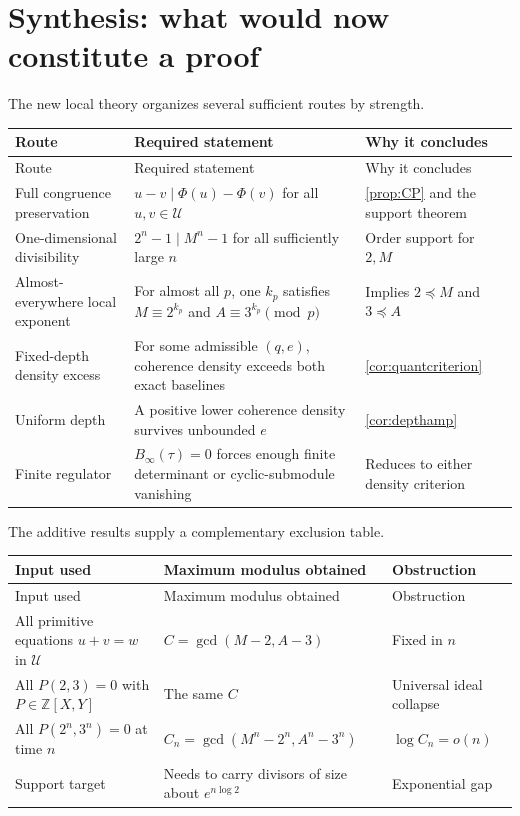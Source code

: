 \documentclass[11pt]{article}
\theoremstyle{definition}
\theoremstyle{remark}
\newcommand{\Z}{\mathbb{Z}}
\begin{document}
\section{Synthesis: what would now constitute a proof}
\label{sec:synthesis}

The new local theory organizes several sufficient routes by strength.

\begin{longtable}{p{}p{}p{}}
\toprule
Route & Required statement & Why it concludes\\
\midrule
\endfirsthead
\toprule
Route & Required statement & Why it concludes\\
\midrule
\endhead
Full congruence preservation &
$u-v\mid\Phi(u)-\Phi(v)$ for all $u,v\in\mathcal U$ &
\cref{prop:CP} and the support theorem\\[4pt]
One-dimensional divisibility &
$2^n-1\mid M^n-1$ for all sufficiently large $n$ &
Order support for $2,M$\\[4pt]
Almost-everywhere local exponent &
For almost all $p$, one $k_p$ satisfies
$M\equiv2^{k_p}$ and $A\equiv3^{k_p}\pmod p$ &
Implies $2\preccurlyeq M$ and $3\preccurlyeq A$\\[4pt]
Fixed-depth density excess &
For some admissible $(q,e)$, coherence density exceeds both exact baselines &
\cref{cor:quantcriterion}\\[4pt]
Uniform depth &
A positive lower coherence density survives unbounded $e$ &
\cref{cor:depthamp}\\[4pt]
Finite regulator &
$B_\infty(\tau)=0$ forces enough finite determinant or cyclic-submodule vanishing &
Reduces to either density criterion\\
\bottomrule
\end{longtable}

The additive results supply a complementary exclusion table.
\begin{longtable}{p{}p{}p{}}
\toprule
Input used & Maximum modulus obtained & Obstruction\\
\midrule
\endfirsthead
\toprule
Input used & Maximum modulus obtained & Obstruction\\
\midrule
\endhead
All primitive equations $u+v=w$ in $\mathcal U$ &
$C=\gcd(M-2,A-3)$ &
Fixed in $n$\\[4pt]
All $P(2,3)=0$ with $P\in\Z[X,Y]$ &
The same $C$ &
Universal ideal collapse\\[4pt]
All $P(2^n,3^n)=0$ at time $n$ &
$C_n=\gcd(M^n-2^n,A^n-3^n)$ &
$\log C_n=o(n)$\\[4pt]
Support target &
Needs to carry divisors of size about $e^{n\log2}$ &
Exponential gap\\
\bottomrule
\end{longtable}
\end{document}
